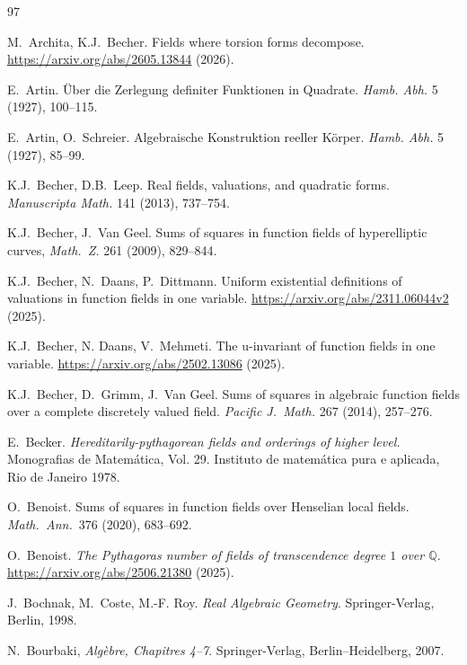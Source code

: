 \documentclass[12pt,leqno]{amsart}
\newcommand{\qq}{\mathbb Q}
\numberwithin{equation}{section}
\theoremstyle{definition}
\theoremstyle{plain}
\begin{document}

\begin{thebibliography}{97}

M.~Archita, K.J.~Becher.
Fields where torsion forms decompose.
 \url{https://arxiv.org/abs/2605.13844} (2026).

E.~Artin.
\newblock 
Über die Zerlegung definiter Funktionen in Quadrate.
{\em Hamb. Abh.} 5 (1927), 100--115.

E.~Artin, O.~Schreier.
\newblock 
Algebraische Konstruktion reeller Körper.
{\em Hamb. Abh.} 5 (1927), 85--99.

K.J.~Becher, D.B.~Leep. Real fields, valuations, and quadratic forms.
{\em Manuscripta Math.} 141 (2013), 737--754.

K.J.~Becher, J.~Van Geel. Sums of squares in function fields of
hyperelliptic curves, \emph{Math.~Z.} {261} (2009), 829--844. 

K.J.~Becher, N.~Daans, P.~Dittmann.
Uniform existential definitions of valuations in function fields in one variable.
\newblock \url{https://arxiv.org/abs/2311.06044v2} (2025).

K.J.~Becher, N. Daans, V.~Mehmeti.
The u-invariant of function fields in one variable.
\url{https://arxiv.org/abs/2502.13086} (2025).

K.J.~Becher, D.~Grimm, J.~Van Geel. Sums of squares in algebraic function fields over a complete discretely valued field. \emph{Pacific J.~Math.} {267} (2014), 257--276.

E.~Becker. \emph{Hereditarily-pythagorean fields and orderings of higher level.} Monografias de Matemática,
Vol. 29. Instituto de matem\'atica pura e aplicada, Rio de Janeiro 1978.

O.~Benoist.
\newblock Sums of squares in function fields over Henselian local fields.
{\em Math.~Ann.}~376 (2020), 683--692.

O.~Benoist.
\emph{The Pythagoras number of fields of transcendence degree $1$ over $\qq$.}\\
\url{https://arxiv.org/abs/2506.21380} (2025).

J.~Bochnak, M.~Coste, M.-F. Roy.
\emph{Real Algebraic Geometry}.
Springer-Verlag, Berlin, 1998.

N.~Bourbaki, {\em Algèbre, Chapitres 4--7}. Springer-Verlag, Berlin--Heidelberg, 2007.


\end{thebibliography}
\end{document}
